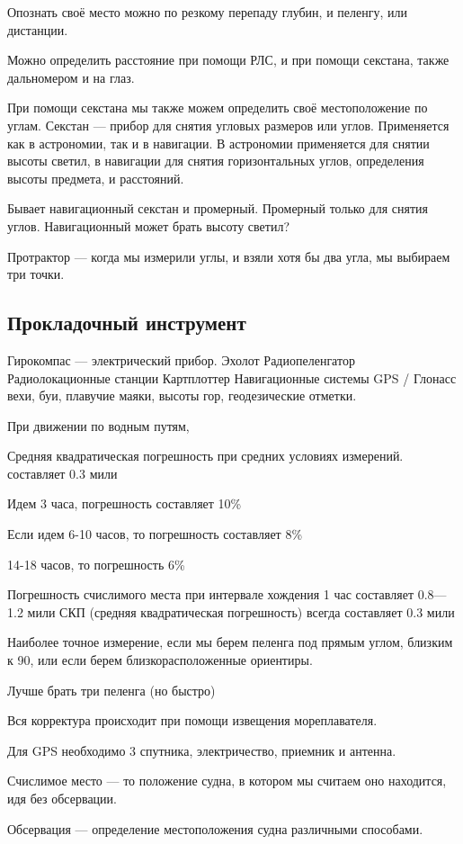 \documentclass{article}        %
\begin{document}
Опознать своё место можно по резкому перепаду глубин, и пеленгу, или дистанции.

Можно определить расстояние при помощи РЛС, и при помощи секстана, 
также дальномером и на глаз. 

При помощи секстана мы также можем определить своё местоположение по углам. 
Секстан --- прибор для снятия угловых размеров или углов. Применяется как в астрономии, так и в навигации. В астрономии применяется для снятии высоты светил, в навигации для снятия горизонтальных углов, определения высоты предмета, и расстояний.

Бывает навигационный секстан и промерный. Промерный только для снятия углов. Навигационный может брать высоту светил?

Протрактор --- когда мы измерили углы, и взяли хотя бы два угла, мы выбираем три точки. 
\subsection{Прокладочный инструмент}
Гирокомпас --- электрический прибор.
Эхолот
Радиопеленгатор
Радиолокационные станции
Картплоттер
Навигационные системы
GPS / Глонасс
вехи, буи, плавучие маяки, высоты гор, геодезические отметки. 

При движении по водным путям,

Средняя квадратическая погрешность при средних условиях измерений. составляет 0.3 мили

Идем 3 часа, погрешность составляет 10\%

Если идем 6-10 часов, то погрешность составляет 8\%

14-18 часов, то погрешность 6\%

Погрешность счислимого места при интервале хождения 1 час составляет 0.8---1.2 мили
СКП (средняя квадратическая погрешность) всегда составляет 0.3 мили

Наиболее точное измерение, если мы берем пеленга под прямым углом, близким к 90\degree, или если берем близкорасположенные ориентиры.

Лучше брать три пеленга (но быстро)

Вся корректура происходит при помощи извещения мореплавателя.

Для GPS необходимо 3 спутника, электричество, приемник и антенна.

Счислимое место --- то положение судна, в котором мы считаем оно находится, 
	идя без обсервации. 

Обсервация --- определение местоположения судна различными способами. 
\end{document}

